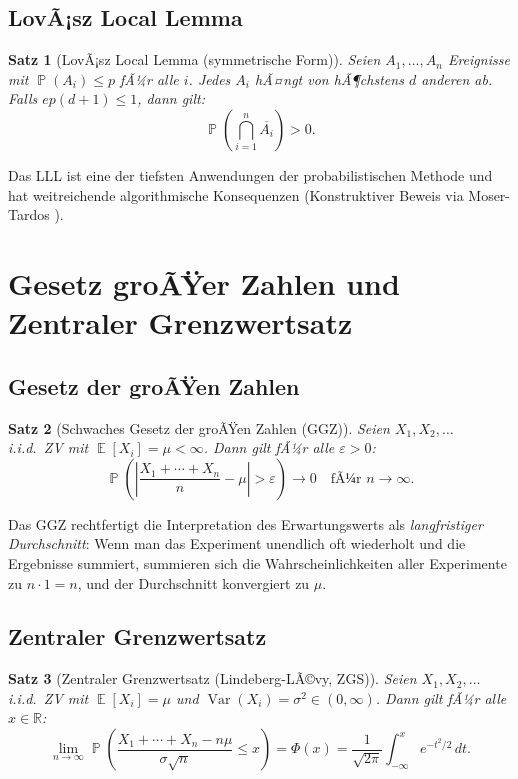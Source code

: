 ﻿\documentclass[12pt,a4paper]{article}
\theoremstyle{definition}
\theoremstyle{plain}
\newtheorem{satz}{Satz}[section]
\theoremstyle{remark}
\DeclareMathOperator{\E}{\mathbb{E}}
\DeclareMathOperator{\Var}{Var}
\DeclareMathOperator{\Prob}{\mathbb{P}}
\begin{document}
\subsection{LovÃ¡sz Local Lemma}

\begin{satz}[LovÃ¡sz Local Lemma (symmetrische Form)]\label{satz:lll}
  Seien $A_1, \ldots, A_n$ Ereignisse mit $\Prob(A_i) \leq p$ fÃ¼r alle $i$.
  Jedes $A_i$ hÃ¤ngt von hÃ¶chstens $d$ anderen ab. Falls $ep(d+1) \leq 1$,
  dann gilt:
  \[
    \Prob\!\left(\bigcap_{i=1}^n \overline{A_i}\right) > 0.
  \]
\end{satz}

Das LLL ist eine der tiefsten Anwendungen der probabilistischen Methode und
hat weitreichende algorithmische Konsequenzen (Konstruktiver Beweis via
Moser-Tardos \cite{moser2010constructive}).

\section{Gesetz groÃŸer Zahlen und Zentraler Grenzwertsatz}
\label{sec:ggz}

\subsection{Gesetz der groÃŸen Zahlen}

\begin{satz}[Schwaches Gesetz der groÃŸen Zahlen (GGZ)]\label{satz:sggz}
  Seien $X_1, X_2, \ldots$ i.i.d.\ ZV mit $\E[X_i] = \mu < \infty$. Dann gilt
  fÃ¼r alle $\varepsilon > 0$:
  \[
    \Prob\!\left(\left|\frac{X_1 + \cdots + X_n}{n} - \mu\right| > \varepsilon\right) \to 0
    \quad \text{fÃ¼r } n \to \infty.
  \]
\end{satz}

Das GGZ rechtfertigt die Interpretation des Erwartungswerts als
\emph{langfristiger Durchschnitt}: Wenn man das Experiment unendlich oft
wiederholt und die Ergebnisse summiert, summieren sich die
Wahrscheinlichkeiten aller Experimente zu $n \cdot 1 = n$, und der
Durchschnitt konvergiert zu $\mu$.

\subsection{Zentraler Grenzwertsatz}

\begin{satz}[Zentraler Grenzwertsatz (Lindeberg-LÃ©vy, ZGS)]\label{satz:zgs}
  Seien $X_1, X_2, \ldots$ i.i.d.\ ZV mit $\E[X_i] = \mu$ und
  $\Var(X_i) = \sigma^2 \in (0,\infty)$. Dann gilt fÃ¼r alle $x \in \mathbb{R}$:
  \[
    \lim_{n\to\infty} \Prob\!\left(\frac{X_1+\cdots+X_n - n\mu}{\sigma\sqrt{n}} \leq x\right)
    = \Phi(x) = \frac{1}{\sqrt{2\pi}}\int_{-\infty}^x e^{-t^2/2}\,dt.
  \]
\end{satz}
\end{document}
